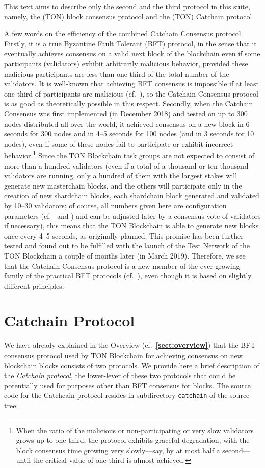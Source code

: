 \documentclass[12pt,oneside]{article}
\def\refpoint#1{{\rm\textbf{\ref{#1}}}}
\let\ptref=\refpoint
\def\mysection#1{\section{#1}\fancyhead[C]{\textsc{Chapter \textbf{\thesection.} #1}}}
\begin{document}
This text aims to describe only the second and the third protocol in this suite, namely, the (TON) block consensus protocol and the (TON) Catchain protocol.

A few words on the efficiency of the combined Catchain Consensus protocol. Firstly, it is a true Byzantine Fault Tolerant (BFT) protocol, in the sense that it eventually achieves consensus on a valid next block of the blockchain even if some participants (validators) exhibit arbitrarily malicious behavior, provided these malicious participants are less than one third of the total number of the validators. It is well-known that achieving BFT consensus is impossible if at least one third of participants are malicious (cf.~\cite{Byzantine}), so the Catchain Consensus protocol is as good as theoretically possible in this respect. Secondly, when the Catchain Consensus was first implemented (in December 2018) and tested on up to 300 nodes distributed all over the world, it achieved consensus on a new block in 6 seconds for 300 nodes and in 4--5 seconds for 100 nodes (and in 3 seconds for 10 nodes), even if some of these nodes fail to participate or exhibit incorrect behavior.\footnote{When the ratio of the malicious or non-participating or very slow validators grows up to one third, the protocol exhibits graceful degradation, with the block consensus time growing very slowly---say, by at most half a second---until the critical value of one third is almost achieved.} Since the TON Blockchain task groups are not expected to consist of more than a hundred validators (even if a total of a thousand or ten thousand validators are running, only a hundred of them with the largest stakes will generate new masterchain blocks, and the others will participate only in the creation of new shardchain blocks, each shardchain block generated and validated by 10--30 validators; of course, all numbers given here are configuration parameters (cf.\ \cite{TON} and \cite{TBC}) and can be adjusted later by a consensus vote of validators if necessary), this means that the TON Blockchain is able to generate new blocks once every 4--5 seconds, as originally planned. This promise has been further tested and found out to be fulfilled with the launch of the Test Network of the TON Blockchain a couple of months later (in March 2019). Therefore, we see that the Catchain Consensus protocol is a new member of the ever growing family of the practical BFT protocols (cf.~\cite{PBFT}), even though it is based on slightly different principles.

\clearpage
\mysection{Catchain Protocol}\label{sect:catchain}
We have already explained in the Overview (cf.~\ptref{sect:overview}) that the BFT consensus protocol used by TON Blockchain for achieving consensus on new blockchain blocks consists of two protocols. We provide here a brief description of the {\em Catchain protocol}, the lower-lever of these two protocols that could be potentially used for purposes other than BFT consensus for blocks. The source code for the Catchcain protocol resides in subdirectory {\tt catchain} of the source tree.
\end{document}
